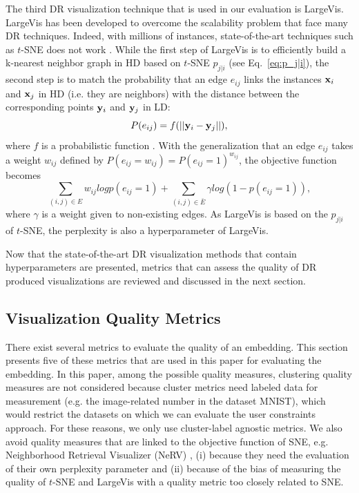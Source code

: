 The third DR visualization technique that is used in our evaluation is LargeVis. LargeVis has been developed to overcome the scalability problem that face many DR techniques. Indeed, with millions of instances, state-of-the-art techniques such as $t$-SNE does not work \cite{tang2016visualizing}. While the first step of LargeVis is to efficiently build a k-nearest neighbor graph in HD based on $t$-SNE $p_{j|i}$ (see Eq.~\ref{eq:p_j|i}), the second step is to match the probability that an edge $e_{ij}$ links the instances ${\bf x}_i$ and ${\bf x}_j$ in HD (i.e. they are neighbors) with the distance between the corresponding points ${\bf y}_i$ and ${\bf y}_j$ in LD:
\begin{equation*}
    P(e_{ij}) = f(||{\bf y}_i - {\bf y}_j||),
\end{equation*}
where $f$ is a probabilistic function \cite{tang2016visualizing}. With the generalization that an edge $e_{ij}$ takes a weight $w_{ij}$ defined by $P(e_{ij} = w_{ij}) = P(e_{ij} = 1)^{w_{ij}}$, the objective function becomes
\begin{equation*}
    \sum_{(i,j) \in E} w_{ij}logp(e_{ij} = 1) + \sum_{(i,j) \in \bar{E}} \gamma log(1 - p(e_{ij} = 1)),
\end{equation*}
where $\gamma$ is a weight given to non-existing edges. As LargeVis is based on the $p_{j|i}$ of $t$-SNE, the perplexity is also a hyperparameter of LargeVis.

Now that the state-of-the-art DR visualization methods that contain hyperparameters are presented, metrics that can assess the quality of DR produced visualizations are reviewed and discussed in the next section.

\subsection{Visualization Quality Metrics}\label{subsec:qual_metrics_background}

There exist several metrics to evaluate the quality of an embedding. This section presents five of these metrics that are used in this paper for evaluating the embedding. 
In this paper, among the possible quality measures, clustering quality measures are not considered because cluster metrics need labeled data for measurement (e.g. the image-related number in the dataset MNIST), which would restrict the datasets on which we can evaluate the user constraints approach.
For these reasons, we only use cluster-label agnostic metrics.
We also avoid quality measures that are linked to the objective function of SNE, e.g. Neighborhood Retrieval Visualizer (NeRV) \cite{venna2010}, (i) because they need the evaluation of their own perplexity parameter and (ii) because of the bias of measuring the quality of $t$-SNE and LargeVis with a quality metric too closely related to SNE.

